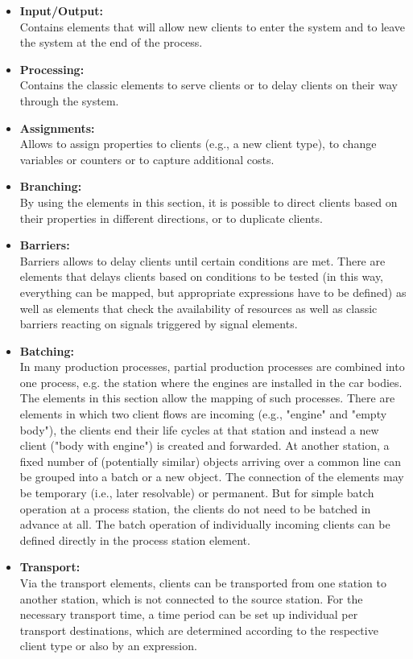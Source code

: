 \documentclass{svmono}
\begin{document}
\begin{itemize}
\item
\textbf{Input/Output:}\\
Contains elements that will allow new clients to enter the system and to leave the system at the end of the process.
\item
\textbf{Processing:}\\
Contains the classic elements to serve clients or to delay clients on their way through the system.
\item
\textbf{Assignments:}\\
Allows to assign properties to clients (e.g., a new client type), to change variables or counters or to capture additional costs.
\item
\textbf{Branching:}\\
By using the elements in this section, it is possible to direct clients based on their properties in different directions, or to duplicate clients.
\item
\textbf{Barriers:}\\
Barriers allows to delay clients until certain conditions are met. There are elements that delays clients based on conditions to be tested (in this way, everything can be mapped, but appropriate expressions have to be defined) as well as elements that check the availability of resources as well as classic barriers reacting on signals triggered by signal elements.
\item
\textbf{Batching:}\\
In many production processes, partial production processes are combined into one process, e.g. the station where the engines are installed in the car bodies. The elements in this section allow the mapping of such processes. There are elements in which two client flows are incoming (e.g., "engine" and "empty body"), the clients end their life cycles at that station and instead a new client ("body with engine") is created and forwarded. At another station, a fixed number of (potentially similar) objects arriving over a common line can be grouped into a batch or a new object. The connection of the elements may be temporary (i.e., later resolvable) or permanent.
But for simple batch operation at a process station, the clients do not need to be batched in advance at all. The batch operation of individually incoming clients can be defined directly in the process station element.
\item
\textbf{Transport:}\\
Via the transport elements, clients can be transported from one station to another station, which is not connected to the source station. For the necessary transport time, a time period can be set up individual per transport destinations, which are determined according to the respective client type or also by an expression.

\end{itemize}
\end{document}
